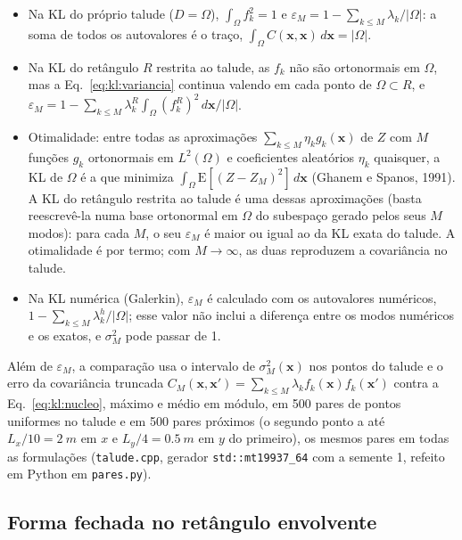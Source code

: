 \begin{itemize}
  \item Na KL do próprio talude ($D = \Omega$), $\int_\Omega f_k^2 = 1$ e $\varepsilon_M = 1 - \sum_{k \le M} \lambda_k / |\Omega|$:
    a soma de todos os autovalores é o traço, $\int_\Omega C(\mathbf{x}, \mathbf{x}) \, d\mathbf{x} = |\Omega|$.
  \item Na KL do retângulo $R$ restrita ao talude, as $f_k$ não são ortonormais em $\Omega$, mas a
    Eq.~\eqref{eq:kl:variancia} continua valendo em cada ponto de $\Omega \subset R$, e
    $\varepsilon_M = 1 - \sum_{k \le M} \lambda_k^R \int_\Omega (f_k^R)^2 \, d\mathbf{x} / |\Omega|$.
  \item Otimalidade: entre todas as aproximações $\sum_{k \le M} \eta_k g_k(\mathbf{x})$ de $Z$ com $M$ funções $g_k$
    ortonormais em $L^2(\Omega)$ e coeficientes aleatórios $\eta_k$ quaisquer, a KL de $\Omega$ é a que minimiza
    $\int_\Omega \mathrm{E}[(Z - Z_M)^2] \, d\mathbf{x}$ (Ghanem e Spanos, 1991). A KL do retângulo restrita ao
    talude é uma dessas aproximações (basta reescrevê-la numa base ortonormal em $\Omega$ do subespaço gerado pelos
    seus $M$ modos): para cada $M$, o seu $\varepsilon_M$ é maior ou igual ao da KL exata do talude. A otimalidade é
    por termo; com $M \to \infty$, as duas reproduzem a covariância no talude.
  \item Na KL numérica (Galerkin), $\varepsilon_M$ é calculado com os autovalores numéricos,
    $1 - \sum_{k \le M} \lambda_k^h / |\Omega|$; esse valor não inclui a diferença entre os modos numéricos e os exatos,
    e $\sigma_M^2$ pode passar de 1.
\end{itemize}
Além de $\varepsilon_M$, a comparação usa o intervalo de $\sigma_M^2(\mathbf{x})$ nos pontos do talude e o erro da
covariância truncada $C_M(\mathbf{x}, \mathbf{x}') = \sum_{k \le M} \lambda_k f_k(\mathbf{x}) f_k(\mathbf{x}')$ contra a
Eq.~\eqref{eq:kl:nucleo}, máximo e médio em módulo, em 500 pares de pontos uniformes no talude e em 500 pares próximos
(o segundo ponto a até $L_x/10 = \SI{2}{m}$ em $x$ e $L_y/4 = \SI{0.5}{m}$ em $y$ do primeiro), os mesmos pares em
todas as formulações (\texttt{talude.cpp}, gerador \texttt{std::mt19937\_64} com a semente 1, refeito em Python em
\texttt{pares.py}).

\subsection{Forma fechada no retângulo envolvente}\label{kl:form:analitica}

